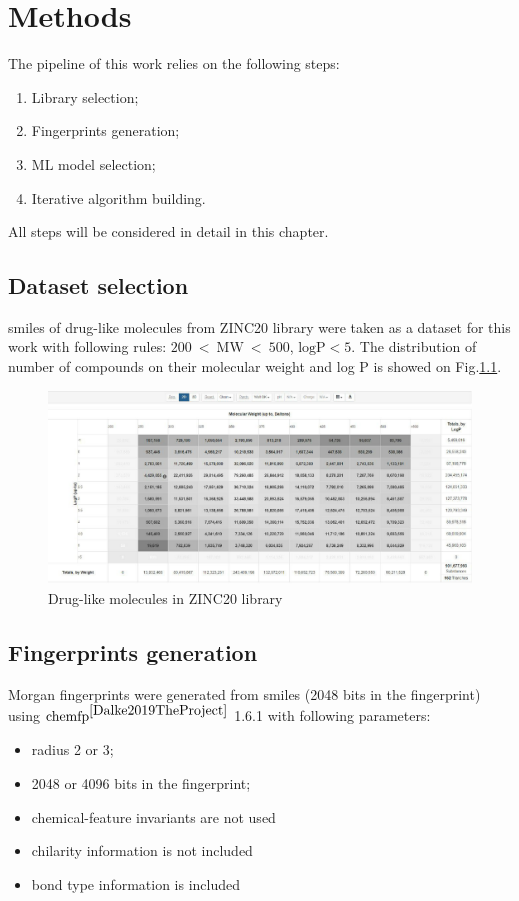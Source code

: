 \chapter{Methods}

The pipeline of this work relies on the following steps:
\begin{enumerate}
    \item Library selection;
    \item Fingerprints generation;
    \item ML model selection;
    \item Iterative algorithm building.
\end{enumerate}
All steps will be considered in detail in this chapter.
\section{Dataset selection}

\acrshort{smiles} of drug-like molecules from ZINC20 library were taken as a dataset for this work with following rules: $200\ <\ \text{MW}\ <\ 500$, $\text{logP} < 5$.
The distribution of number of compounds on their molecular weight and log P is showed on  Fig.\ref{zinc}.

\begin{figure}[H]
    \centering
    \includegraphics[scale=0.35]{Images/zinc.jpg}
    \caption{Drug-like molecules in ZINC20 library}
   \label{zinc}
\end{figure}

\section{Fingerprints generation}

Morgan fingerprints were generated from \acrshort{smiles} (2048 bits in the fingerprint) using $\text{chemfp}^{\cite{Dalke2019TheProject}}$ 1.6.1 with following parameters:
\begin{itemize}
    \item radius 2 or 3;
    \item 2048 or 4096 bits in the fingerprint;
    \item chemical-feature invariants are not used
    \item chilarity information is not included
    \item bond type information is included
\end{itemize}

